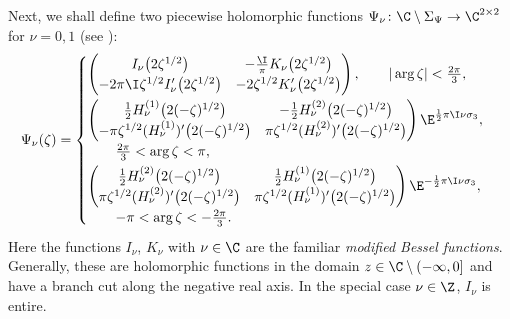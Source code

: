 Next, we shall define two piecewise holomorphic functions $\Psi_\nu\colon \C \setminus \Sigma_\Psi \to \C^{2\times2}$ for $\nu = 0, 1$ (see \cite[equation~(6.51)]{KMVV}):
\begin{align*}
 \Psi_\nu(\zeta) =
 \begin{cases}
 \begin{pmatrix}
 I_\nu\big(2\zeta^{1/2}\big) & -\frac{\I}{\pi} K_\nu\big(2\zeta^{1/2}\big)
 \\
 -2\pi \I \zeta^{1/2} I_\nu'\big(2\zeta^{1/2}\big) & -2 \zeta^{1/2} K_\nu'\big(2\zeta^{1/2}\big)
 \end{pmatrix}, \qquad |\arg \zeta | < \frac{2\pi}{3},\vspace{1mm}
 \\
 \begin{pmatrix}
 \frac{1}{2}H^{(1)}_\nu\big(2(-\zeta)^{1/2}\big) & -\frac{1}{2}H^{(2)}_\nu\big(2(-\zeta)^{1/2}\big)
 \\
 -\pi\zeta^{1/2}(H^{(1)}_\nu)'\big(2(-\zeta)^{1/2}\big) & \pi\zeta^{1/2}(H^{(2)}_\nu)'\big(2(-\zeta)^{1/2}\big)
 \end{pmatrix}\E^{\frac{1}{2}\pi\I\nu \sigma_3},
 \\
 \qquad\frac{2\pi}{3} < \arg \zeta < \pi,\vspace{1mm}
 \\
 \begin{pmatrix}
 \frac{1}{2}H^{(2)}_\nu\big(2(-\zeta)^{1/2}\big) & \frac{1}{2}H^{(1)}_\nu\big(2(-\zeta)^{1/2}\big)
 \\
 \pi\zeta^{1/2}(H^{(2)}_\nu)'\big(2(-\zeta)^{1/2}\big) & \pi\zeta^{1/2}(H^{(1)}_\nu)'\big(2(-\zeta)^{1/2}\big)
 \end{pmatrix}\E^{-\frac{1}{2} \pi\I\nu \sigma_3},
 \\
 \qquad-\pi < \arg \zeta < -\tfrac{2\pi}{3}.
 \end{cases}
\end{align*}
Here the functions $I_\nu$, $K_\nu$ with $\nu \in \C$ are the familiar \emph{modified Bessel functions}. Generally, these are holomorphic functions in the domain $z\in \C\setminus (-\infty, 0]$ and have a branch cut along the negative real axis. In the special case $\nu \in \Z$, $I_\nu$ is entire.

